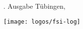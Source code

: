 \thispagestyle{empty}
{\sf \number\auflage. Ausgabe \hfill Tübingen, \Month\space \number\jahr}\\
\vspace{5cm}

\texttt{[image: logos/fsi-log]}


\begin{center}
%
%
%
%
\vfill
\end{center}
\eject